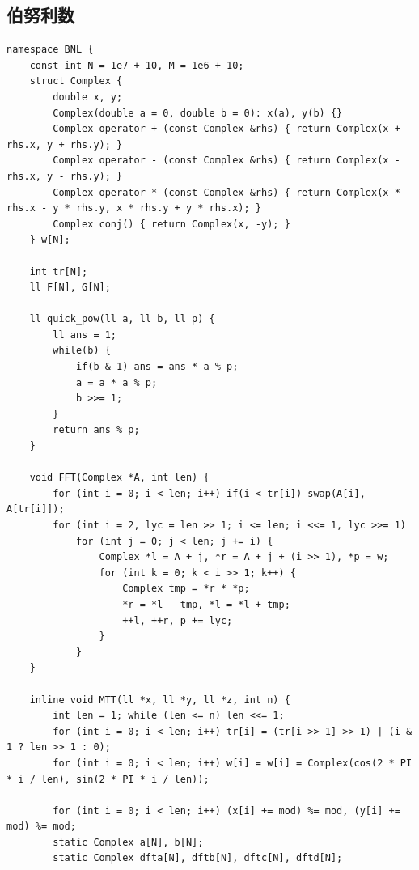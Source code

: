 \documentclass[twoside]{article}
\begin{document}
\subsection{伯努利数}
\begin{lstlisting}
namespace BNL {
    const int N = 1e7 + 10, M = 1e6 + 10;
    struct Complex {
        double x, y;
        Complex(double a = 0, double b = 0): x(a), y(b) {}
        Complex operator + (const Complex &rhs) { return Complex(x + rhs.x, y + rhs.y); }
        Complex operator - (const Complex &rhs) { return Complex(x - rhs.x, y - rhs.y); }
        Complex operator * (const Complex &rhs) { return Complex(x * rhs.x - y * rhs.y, x * rhs.y + y * rhs.x); }
        Complex conj() { return Complex(x, -y); }
    } w[N];

    int tr[N];
    ll F[N], G[N];

    ll quick_pow(ll a, ll b, ll p) {
        ll ans = 1;
        while(b) {
            if(b & 1) ans = ans * a % p;
            a = a * a % p;
            b >>= 1;
        }
        return ans % p;
    }

    void FFT(Complex *A, int len) {
        for (int i = 0; i < len; i++) if(i < tr[i]) swap(A[i], A[tr[i]]);
        for (int i = 2, lyc = len >> 1; i <= len; i <<= 1, lyc >>= 1)
            for (int j = 0; j < len; j += i) {
                Complex *l = A + j, *r = A + j + (i >> 1), *p = w;
                for (int k = 0; k < i >> 1; k++) {
                    Complex tmp = *r * *p;
                    *r = *l - tmp, *l = *l + tmp;
                    ++l, ++r, p += lyc;
                }
            }
    }

    inline void MTT(ll *x, ll *y, ll *z, int n) {
        int len = 1; while (len <= n) len <<= 1;
        for (int i = 0; i < len; i++) tr[i] = (tr[i >> 1] >> 1) | (i & 1 ? len >> 1 : 0);
        for (int i = 0; i < len; i++) w[i] = w[i] = Complex(cos(2 * PI * i / len), sin(2 * PI * i / len));

        for (int i = 0; i < len; i++) (x[i] += mod) %= mod, (y[i] += mod) %= mod;
        static Complex a[N], b[N];
        static Complex dfta[N], dftb[N], dftc[N], dftd[N];


\end{lstlisting}
\end{document}
